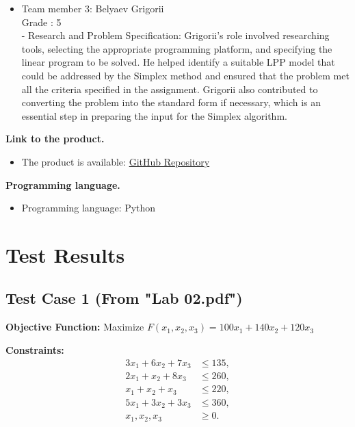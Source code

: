\documentclass[12pt, legalpaper]{exam}
\begin{document}
\begin{itemize}
    \item Team member 3: Belyaev Grigorii
    \\ Grade : 5
    \\- Research and Problem Specification: Grigorii's role involved researching tools, selecting the appropriate programming platform, and specifying the linear program to be solved. He helped identify a suitable LPP model that could be addressed by the Simplex method and ensured that the problem met all the criteria specified in the assignment. Grigorii also contributed to converting the problem into the standard form if necessary, which is an essential step in preparing the input for the Simplex algorithm.
\end{itemize}
\vspace{12pt}
\noindent     
\textbf{Link to the product.}
\begin{itemize}
    \item The product is available: \href{https://github.com/GodDamnMan/Optimization_prog_1}{GitHub Repository}
\end{itemize}

\vspace{12pt}

\noindent  \textbf{Programming language.}
\begin{itemize}
    \item Programming language:  Python
\end{itemize}

\vspace{12pt}

\section*{Test Results}

\subsection*{Test Case 1 (From "Lab 02.pdf")}

\textbf{Objective Function:} Maximize \( F(x_1, x_2, x_3) = 100x_1 + 140x_2 + 120x_3 \)

\textbf{Constraints:}
\[
\begin{aligned}
3x_1 + 6x_2 + 7x_3 &\leq 135, \\
2x_1 + x_2 + 8x_3 &\leq 260, \\
x_1 + x_2 + x_3 &\leq 220, \\
5x_1 + 3x_2 + 3x_3 &\leq 360, \\
x_1, x_2, x_3 &\geq 0.
\end{aligned}
\]
\end{document}
